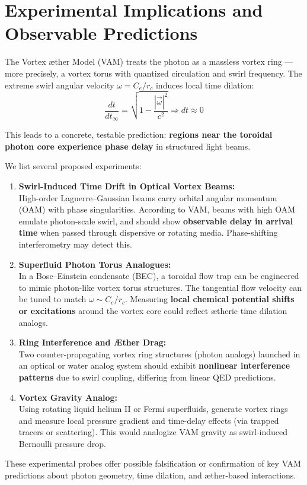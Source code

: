 \section{Experimental Implications and Observable Predictions}

The Vortex \ae ther Model (VAM) treats the photon as a massless vortex ring — more precisely, a vortex torus with quantized circulation and swirl frequency. The extreme swirl angular velocity \( \omega = C_e / r_c \) induces local time dilation:
\begin{equation}
    \frac{dt}{dt_\infty} = \sqrt{1 - \frac{|\vec{\omega}|^2}{c^2}} \Rightarrow dt \approx 0
\end{equation}

This leads to a concrete, testable prediction: \textbf{regions near the toroidal photon core experience phase delay} in structured light beams.

We list several proposed experiments:

\begin{enumerate}
    \item \textbf{Swirl-Induced Time Drift in Optical Vortex Beams:}\\
    High-order Laguerre–Gaussian beams carry orbital angular momentum (OAM) with phase singularities. According to VAM, beams with high OAM emulate photon-scale swirl, and should show \textbf{observable delay in arrival time} when passed through dispersive or rotating media. Phase-shifting interferometry may detect this.

    \item \textbf{Superfluid Photon Torus Analogues:}\\
    In a Bose–Einstein condensate (BEC), a toroidal flow trap can be engineered to mimic photon-like vortex torus structures. The tangential flow velocity can be tuned to match \( \omega \sim C_e / r_c \). Measuring \textbf{local chemical potential shifts or excitations} around the vortex core could reflect ætheric time dilation analogs.

    \item \textbf{Ring Interference and Æther Drag:}\\
    Two counter-propagating vortex ring structures (photon analogs) launched in an optical or water analog system should exhibit \textbf{nonlinear interference patterns} due to swirl coupling, differing from linear QED predictions.

    \item \textbf{Vortex Gravity Analog:}\\
    Using rotating liquid helium II or Fermi superfluids, generate vortex rings and measure local pressure gradient and time-delay effects (via trapped tracers or scattering). This would analogize VAM gravity as swirl-induced Bernoulli pressure drop.
\end{enumerate}

These experimental probes offer possible falsification or confirmation of key VAM predictions about photon geometry, time dilation, and æther-based interactions.